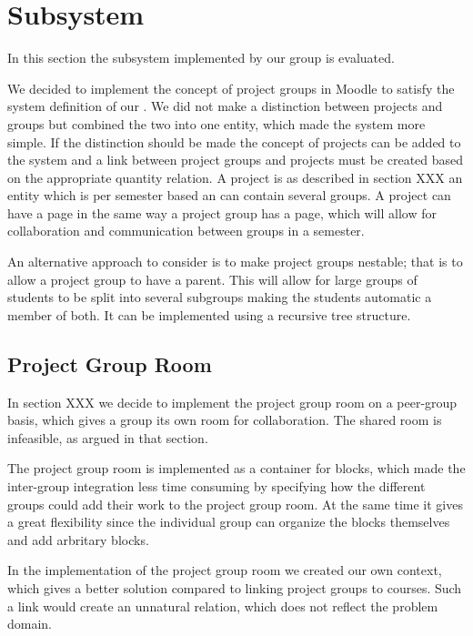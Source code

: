 \section{Subsystem}
In this section the subsystem implemented by our group is evaluated. 

We decided to implement the concept of project groups in Moodle to satisfy the system definition of our \system{}.
We did not make a distinction between projects and groups but combined the two into one entity, which made the system more simple. 
If the distinction should be made the concept of projects can be added to the system and a link between project groups and projects must be created based on the appropriate quantity relation. 
A project is as described in section XXX an entity which is per semester based an can contain several groups. 
A project can have a page in the same way a project group has a page, which will allow for collaboration and communication between groups in a semester. 

An alternative approach to consider is to make project groups nestable; that is to allow a project group to have a parent.
This will allow for large groups of students to be split into several subgroups making the students automatic a member of both. %
It can be implemented using a recursive tree structure.



\subsection{Project Group Room}
In section XXX we decide to implement the project group room on a peer-group basis, which gives a group its own room for collaboration. %
The shared room is infeasible, as argued in that section. 

The project group room is implemented as a container for blocks, which made the inter-group integration less time consuming by specifying how the different groups could add their work to the project group room. 
At the same time it gives a great flexibility since the individual group can organize the blocks themselves and add arbritary blocks.

In the implementation of the project group room we created our own context, which gives a better solution compared to linking project groups to courses. 
Such a link would create an unnatural relation, which does not reflect the problem domain.   



